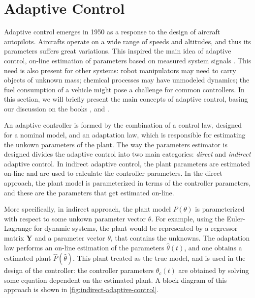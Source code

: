 \section{Adaptive Control}\label{sec:background-adaptive-control}
Adaptive control emerges in 1950 as a response to the design of aircraft autopilots. Aircrafts operate on a wide range of speeds and altitudes, and thus its parameters suffers great variations. This inspired the main idea of adaptive control, on-line estimation of parameters based on measured system signals \citep{Slotine1991}. This need is also present for other systems: robot manipulators may need to carry objects of unknown mass; chemical processes may have unmodeled dynamics; the fuel consumption of a vehicle might pose a challenge for common controllers. In this section, we will briefly present the main concepts of adaptive control, basing our discussion on the books \citet{Slotine1991}, \citet{Krstic1995} and \citet{Ioannou2012}.

An adaptive controller is formed by the combination of a control law, designed for a nominal model, and an adaptation law, which is responsible for estimating the unkown parameters of the plant. The way the parameters estimator is designed divides the adaptive control into two main categories: \emph{direct} and \emph{indirect} adaptive control. In indirect adaptive control, the plant parameters are estimated on-line and are used to calculate the controller parameters. In the direct approach, the plant model is parameterized in terms of the controller parameters, and these are the parameters that get estimated on-line.

More specifically, in indirect approach, the plant model $P(\theta)$ is parameterized with respect to some unkown parameter vector $\theta$. For example, using the Euler-Lagrange for dynamic systems, the plant would be represented by a regressor matrix $\mathbf{Y}$ and a parameter vector $\theta$, that contains the unknowns. The adaptation law performs an on-line estimation of the parameters $\widehat{\theta}(t)$, and one obtains a estimated plant $\widehat{P}(\widehat{\theta})$. This plant treated as the true model, and is used in the design of the controller: the controller parameters $\theta_c(t)$ are obtained by solving some equation dependent on the estimated plant. A block diagram of this approach is shown in \cref{fig:indirect-adaptive-control}.

